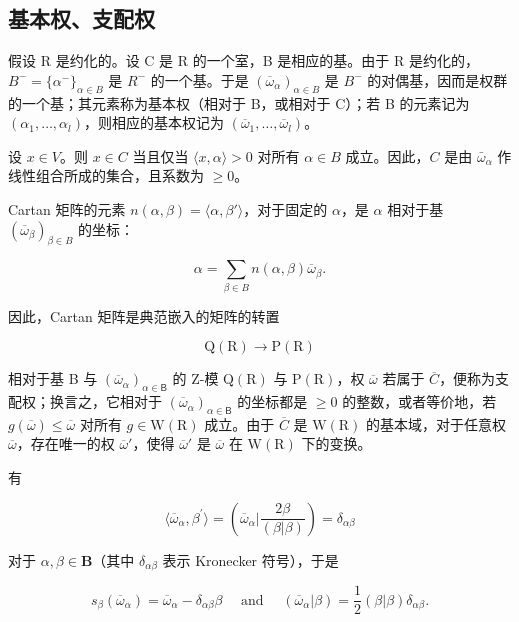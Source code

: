 \subsection{基本权、支配权}

假设 R 是约化的。设 C 是 R 的一个室，B 是相应的基。由于 R 是约化的，\(B^{-} = \{\alpha^{-}\}_{\alpha \in B}\) 是 \(R^{-}\) 的一个基。于是 \((\overline{\omega}_{\alpha})_{\alpha \in B}\) 是 \(B^{-}\) 的对偶基，因而是权群的一个基；其元素称为基本权（相对于 B，或相对于 C）；若 B 的元素记为 \((\alpha_{1}, \ldots, \alpha_{l})\)，则相应的基本权记为 \((\overline{\omega}_{1}, \ldots, \overline{\omega}_{l})\)。

设 \(x \in V\)。则 \(x \in C\) 当且仅当 \(\langle x, \alpha \rangle > 0\) 对所有 \(\alpha \in B\) 成立。因此，\(C\) 是由 \(\bar{\omega}_{\alpha}\) 作线性组合所成的集合，且系数为 \(\geqslant 0\)。

Cartan 矩阵的元素 \(n(\alpha, \beta) = \langle \alpha, \beta' \rangle\)，对于固定的 \(\alpha\)，是 \(\alpha\) 相对于基 \((\overline{\omega}_{\beta})_{\beta \in B}\) 的坐标：

\[
\alpha = \sum_ {\beta \in B} n (\alpha , \beta) \overline {{\omega}} _ {\beta}.\tag{14}
\]

因此，Cartan 矩阵是典范嵌入的矩阵的转置

\[
\mathrm{Q} (\mathrm{R}) \rightarrow \mathrm{P} (\mathrm{R})
\]

相对于基 B 与 \((\overline{\omega}_{\alpha})_{\alpha\in\mathsf{B}}\) 的 Z-模 \(\mathrm{Q}(\mathrm{R})\) 与 \(\mathrm{P}(\mathrm{R})\)，权 \(\overline{\omega}\) 若属于 \(\overline{C}\)，便称为支配权；换言之，它相对于 \((\overline{\omega}_{\alpha})_{\alpha\in\mathsf{B}}\) 的坐标都是 \(\geqslant0\) 的整数，或者等价地，若 \(g(\overline{\omega})\leqslant\overline{\omega}\) 对所有 \(g\in\mathrm{W}(\mathrm{R})\) 成立。由于 \(\overline{C}\) 是 \(\mathrm{W(R)}\) 的基本域，对于任意权 \(\overline{\omega}\)，存在唯一的权 \(\overline{\omega}'\)，使得 \(\overline{\omega}'\) 是 \(\overline{\omega}\) 在 \(\mathrm{W(R)}\) 下的变换。

有

\[
\langle \overline {{{{\omega}}}} _ {\alpha}, \beta^ {\prime} \rangle = (\overline {{{{\omega}}}} _ {\alpha} | \frac {2 \beta}{(\beta | \beta)}) = \delta_ {\alpha \beta}
\]

对于 \(\alpha, \beta \in \mathbf{B}\)（其中 \(\delta_{\alpha\beta}\) 表示 Kronecker 符号），于是

\[
s _ {\beta} (\overline {{\omega}} _ {\alpha}) = \overline {{\omega}} _ {\alpha} - \delta_ {\alpha \beta} \beta \quad \text { and } \quad (\overline {{\omega}} _ {\alpha} | \beta) = \frac {1}{2} (\beta | \beta) \delta_ {\alpha \beta}.
\]

